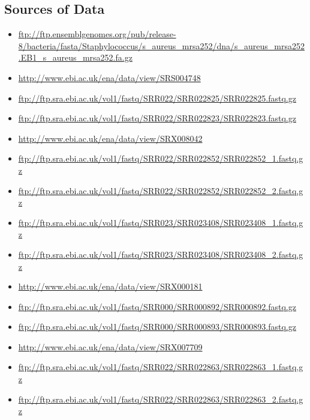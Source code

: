 \subsection{Sources of Data}
\begin{itemize}
\item \url{ftp://ftp.ensemblgenomes.org/pub/release-8/bacteria/fasta/Staphylococcus/s_aureus_mrsa252/dna/s_aureus_mrsa252.EB1_s_aureus_mrsa252.fa.gz}
\item \url{http://www.ebi.ac.uk/ena/data/view/SRS004748}
\item \url{ftp://ftp.sra.ebi.ac.uk/vol1/fastq/SRR022/SRR022825/SRR022825.fastq.gz}
\item \url{ftp://ftp.sra.ebi.ac.uk/vol1/fastq/SRR022/SRR022823/SRR022823.fastq.gz}
\item \url{http://www.ebi.ac.uk/ena/data/view/SRX008042}
\item \url{ftp://ftp.sra.ebi.ac.uk/vol1/fastq/SRR022/SRR022852/SRR022852_1.fastq.gz}
\item \url{ftp://ftp.sra.ebi.ac.uk/vol1/fastq/SRR022/SRR022852/SRR022852_2.fastq.gz}
\item \url{ftp://ftp.sra.ebi.ac.uk/vol1/fastq/SRR023/SRR023408/SRR023408_1.fastq.gz}
\item \url{ftp://ftp.sra.ebi.ac.uk/vol1/fastq/SRR023/SRR023408/SRR023408_2.fastq.gz}
\item \url{http://www.ebi.ac.uk/ena/data/view/SRX000181}
\item \url{ftp://ftp.sra.ebi.ac.uk/vol1/fastq/SRR000/SRR000892/SRR000892.fastq.gz}
\item \url{ftp://ftp.sra.ebi.ac.uk/vol1/fastq/SRR000/SRR000893/SRR000893.fastq.gz}
\item \url{http://www.ebi.ac.uk/ena/data/view/SRX007709}
\item \url{ftp://ftp.sra.ebi.ac.uk/vol1/fastq/SRR022/SRR022863/SRR022863_1.fastq.gz}
\item \url{ftp://ftp.sra.ebi.ac.uk/vol1/fastq/SRR022/SRR022863/SRR022863_2.fastq.gz}
\end{itemize}

